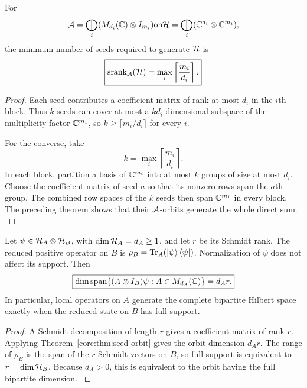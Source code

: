 \begin{theorem}\label{core:theorem:002}\label{core:thm:seed-rank}
For
\[
\cA=\bigoplus_i(M_{d_i}(\bbC)\otimes I_{m_i})
\quad\text{on}\quad
\cH=\bigoplus_i(\bbC^{d_i}\otimes\bbC^{m_i}),
\]
the minimum number of seeds required to generate $\cH$ is
\[
\boxed{
\operatorname{srank}_{\cA}(\cH)
=
\max_i\left\lceil\frac{m_i}{d_i}\right\rceil.
}
\]
\end{theorem}

\begin{proof}\label{core:proof:002}
Each seed contributes a coefficient matrix of rank at most $d_i$ in the $i$th block. Thus $k$ seeds can cover at most a $kd_i$-dimensional subspace of the multiplicity factor $\bbC^{m_i}$, so $k\ge\lceil m_i/d_i\rceil$ for every $i$.

For the converse, take
\[
k=\max_i\left\lceil\frac{m_i}{d_i}\right\rceil.
\]
In each block, partition a basis of $\bbC^{m_i}$ into at most $k$ groups of size at most $d_i$. Choose the coefficient matrix of seed $a$ so that its nonzero rows span the $a$th group. The combined row spaces of the $k$ seeds then span $\bbC^{m_i}$ in every block. The preceding theorem shows that their $\cA$-orbits generate the whole direct sum.
\label{core:proof:002:end}\end{proof}

\begin{corollary}\label{core:corollary:001}\label{core:thm:schmidt}
Let $\psi\in\cH_A\otimes\cH_B$, with $\dim\cH_A=d_A\ge1$, and let $r$ be its Schmidt rank. The reduced positive operator on $B$ is $\rho_B=\operatorname{Tr}_A(\left|\psi\right\rangle\left\langle\psi\right|)$. Normalization of $\psi$ does not affect its support. Then
\[
\boxed{
\dim\operatorname{span}\{(A\otimes I_B)\psi:A\in M_{d_A}(\bbC)\}
=d_A r.
}
\]
In particular, local operators on $A$ generate the complete bipartite Hilbert space exactly when the reduced state on $B$ has full support.
\end{corollary}

\begin{proof}\label{core:proof:003}
A Schmidt decomposition of length $r$ gives a coefficient matrix of rank $r$. Applying Theorem~\ref{core:thm:seed-orbit} gives the orbit dimension $d_A r$. The range of $\rho_B$ is the span of the $r$ Schmidt vectors on $B$, so full support is equivalent to $r=\dim\cH_B$. Because $d_A>0$, this is equivalent to the orbit having the full bipartite dimension.
\label{core:proof:003:end}\end{proof}

